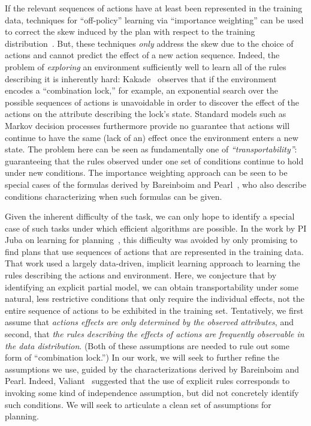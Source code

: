 \documentclass[12pt]{article}
\begin{document}
If the relevant sequences of actions have at least been represented in the training data, techniques for ``off-policy'' learning via ``importance weighting'' can be used to correct the skew induced by the plan with respect to the training distribution~\cite{precup2000off-policy,precup2001off-policy,shelton2001,peshkin2001,peshkin2002,uchibe2004,wawrzynski2009,hachiya2009,hachiya2011,juba2016jmlr}. But, these techniques {\em only} address the skew due to the choice of actions and cannot predict the effect of a new action sequence. Indeed, the problem of {\em exploring} an environment sufficiently well to learn all of the rules describing it is inherently hard: Kakade~\cite[Section~8.6]{kakade2003thesis} observes that if the environment encodes a ``combination lock,'' for example, an exponential search over the possible sequences of actions is unavoidable in order to discover the effect of the actions on the attribute describing the lock's state. Standard models such as Markov decision processes furthermore provide no guarantee that actions will continue to have the same (lack of an) effect once the environment enters a new state. The problem here can be seen as fundamentally one of {\em ``transportability''}: guaranteeing that the rules observed under one set of conditions continue to hold under new conditions. The importance weighting approach can be seen to be special cases of the formulas derived by Bareinboim and Pearl~\cite{bareinboim2012completeness,bareinboim2013algorithm}, who also describe conditions characterizing when such formulas can be given.

Given the inherent difficulty of the task, we can only hope to identify a special case of such tasks under which efficient algorithms are possible. In the work by PI Juba on learning for planning~\cite{juba2016jmlr}, this difficulty was avoided by only promising to find plans that use sequences of actions that are represented in the training data. That work used a largely data-driven, implicit learning approach to learning the rules describing the actions and environment. Here, we conjecture that by identifying an explicit partial model, we can obtain transportability under some natural, less restrictive conditions that only require the individual effects, not the entire sequence of actions to be exhibited in the training set. Tentatively, we first assume that {\em actions effects are only determined by the observed attributes}, and second, that {\em the rules describing the effects of actions are frequently observable in the data distribution}. (Both of these assumptions are needed to rule out some form of ``combination lock.'') In our work, we will seek to further refine the assumptions we use, guided by the characterizations derived by Bareinboim and Pearl. Indeed, Valiant~\cite{valiant2006knowledgeInfusion} suggested that the use of explicit rules corresponds to invoking some kind of independence assumption, but did not concretely identify such conditions. We will seek to articulate a clean set of assumptions for planning.
\end{document}
